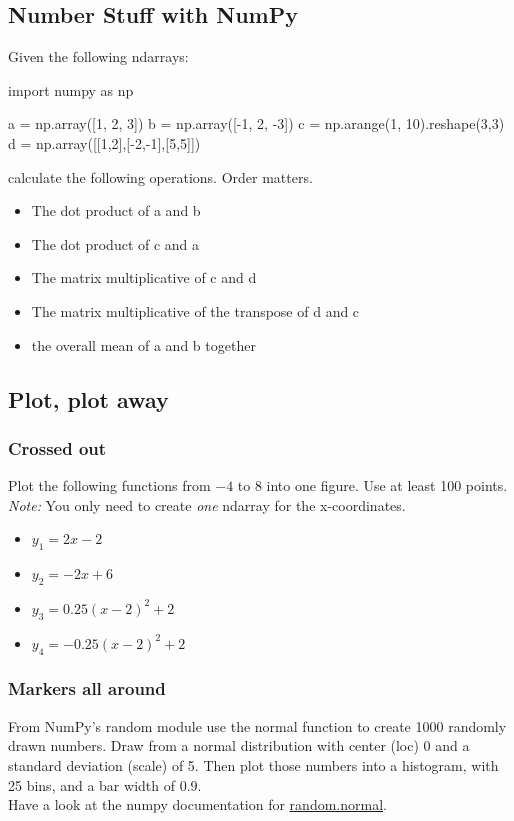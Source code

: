 \subsection{Number Stuff with NumPy}
Given the following ndarrays:
\begin{python}
import numpy as np


a = np.array([1, 2, 3])
b = np.array([-1, 2, -3])
c = np.arange(1, 10).reshape(3,3)
d = np.array([[1,2],[-2,-1],[5,5]])
\end{python}
calculate the following operations. Order matters.
\begin{itemize}
	\item The dot product of a and b
	\item The dot product of c and a
	\item The matrix multiplicative of c and d
	\item The matrix multiplicative of the transpose of d and c
	\item the overall mean of a and b together
\end{itemize}

\subsection{Plot, plot away}
\subsubsection{Crossed out}
Plot the following functions from $-4$ to $8$ into one figure.
Use at least 100 points.\\
\emph{Note:} You only need to create \textit{one} ndarray for the x-coordinates.
\begin{itemize}
	\item $y_1 = 2x - 2$
	\item $y_2 = -2x + 6$
	\item $y_3 = 0.25(x - 2)^2 + 2$
	\item $y_4 = -0.25(x - 2)^2 + 2$
\end{itemize}

\subsubsection{Markers all around}
From NumPy's random module use the normal function to create 1000 randomly
drawn numbers. Draw from a normal distribution with center (loc) 0 and a
standard deviation (scale) of 5. Then plot those numbers into a histogram,
with 25 bins, and a bar width of 0.9.\\
Have a look at the numpy documentation for 
\href{https://docs.scipy.org/doc/numpy/reference/generated/numpy.random.normal.html#numpy.random.normal}{random.normal}.

